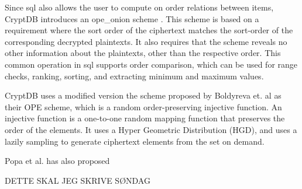 Since \Gls{sql} also allows the user to compute on order relations between items, CryptDB introduces an \Gls{ope_onion} scheme \citep{CryptDB_Main_Paper}. This scheme is based on a requirement where the sort order of the ciphertext matches the sort-order of the corresponding decrypted plaintexts. It also requires that the scheme reveals no other information about the plaintexts, other than the respective order. This common operation in \Gls{sql} supports order comparison, which can be used for range checks, ranking, sorting, and extracting minimum and maximum values. 

CryptDB uses a modified version the scheme proposed by Boldyreva et. al \citep{ope_cryptdb} as their OPE scheme, which is a random order-preserving injective function. An injective function is a one-to-one random mapping function that preserves the order of the elements. It uses a Hyper Geometric Distribution (HGD), and uses a lazily sampling to generate ciphertext elements from the set on demand.


Popa et al. has also proposed 

DETTE SKAL JEG SKRIVE SØNDAG




